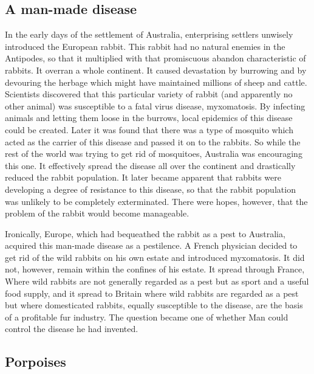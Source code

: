 \documentclass[11pt]{article}
\begin{document}
\subsection{A man-made disease}
\label{sec-2-17}

In the early days of the settlement of Australia, enterprising settlers unwisely introduced the European rabbit. This rabbit had no natural enemies in the Antipodes, so that it multiplied with that promiscuous abandon characteristic of rabbits. It overran a whole continent. It caused devastation by burrowing and by devouring the herbage which might have maintained millions of sheep and cattle. Scientists discovered that this particular variety of rabbit (and apparently no other animal) was susceptible to a fatal virus disease, myxomatosis. By infecting animals and letting them loose in the burrows, local epidemics of this disease could be created. Later it was found that there was a type of mosquito which acted as the carrier of this disease and passed it on to the rabbits. So while the rest of the world was trying to get rid of mosquitoes, Australia was encouraging this one. It effectively spread the disease all over the continent and drastically reduced the rabbit population. It later became apparent that rabbits were developing a degree of resistance to this disease, so that the rabbit population was unlikely to be completely exterminated. There were hopes, however, that the problem of the rabbit would become manageable.

Ironically, Europe, which had bequeathed the rabbit as a pest to Australia, acquired this man-made disease as a pestilence. A French physician decided to get rid of the wild rabbits on his own estate and introduced myxomatosis. It did not, however, remain within the confines of his estate. It spread through France, Where wild rabbits are not generally regarded as a pest but as sport and a useful food supply, and it spread to Britain where wild rabbits are regarded as a pest but where domesticated rabbits, equally susceptible to the disease, are the basis of a profitable fur industry. The question became one of whether Man could control the disease he had invented.
\subsection{Porpoises}
\label{sec-2-18}
\end{document}
